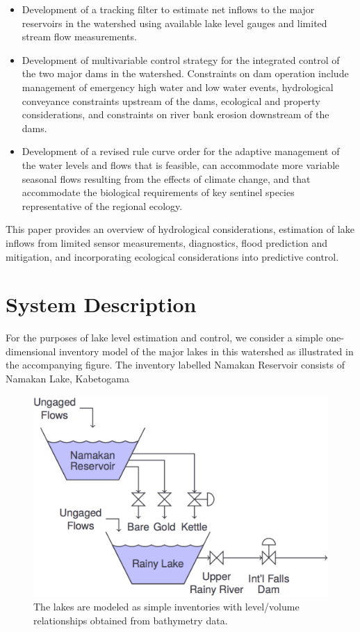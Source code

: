 \documentclass[preprint,times]{elsarticle}
\begin{document}
\begin{itemize}
\item Development of a tracking filter to estimate net inflows to the major reservoirs in the watershed using available lake level gauges and limited stream flow measurements.
\item Development of multivariable control strategy for the integrated control of the two major dams in the watershed.  Constraints on dam operation include management of emergency high water and low water events, hydrological conveyance constraints upstream of the dams, ecological and property considerations, and constraints on river bank erosion downstream of the dams.
\item Development of a revised rule curve order for the adaptive management of the water levels and flows that is feasible, can accommodate more variable seasonal flows resulting from the effects of climate change, and that accommodate the biological requirements of key sentinel species representative of the regional ecology.	
\end{itemize}

This paper provides an overview of hydrological considerations, estimation of lake inflows from limited sensor measurements, diagnostics, flood prediction and mitigation, and incorporating ecological considerations into predictive control.

\section{System Description}

For the purposes of lake level estimation and control, we consider a simple one-dimensional inventory model of the major lakes in this watershed as illustrated in the accompanying figure. The inventory labelled Namakan Reservoir consists of Namakan Lake, Kabetogama 

\begin{figure}
\includegraphics[width=\linewidth]{FlowDiagram}
\caption{The lakes are modeled as simple inventories with level/volume relationships obtained from bathymetry data.}\label{figure:5}
\end{figure}
\end{document}
